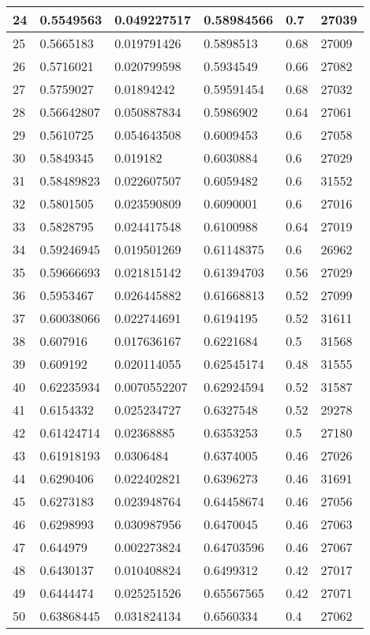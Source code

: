\begin{longtable}{|l|l|l|l|l|l|}
24 & 0.5549563 & 0.049227517 & 0.58984566 & 0.7 & 27039 \\ \hline 
25 & 0.5665183 & 0.019791426 & 0.5898513 & 0.68 & 27009 \\ \hline 
26 & 0.5716021 & 0.020799598 & 0.5934549 & 0.66 & 27082 \\ \hline 
27 & 0.5759027 & 0.01894242 & 0.59591454 & 0.68 & 27032 \\ \hline 
28 & 0.56642807 & 0.050887834 & 0.5986902 & 0.64 & 27061 \\ \hline 
29 & 0.5610725 & 0.054643508 & 0.6009453 & 0.6 & 27058 \\ \hline 
30 & 0.5849345 & 0.019182 & 0.6030884 & 0.6 & 27029 \\ \hline 
31 & 0.58489823 & 0.022607507 & 0.6059482 & 0.6 & 31552 \\ \hline 
32 & 0.5801505 & 0.023590809 & 0.6090001 & 0.6 & 27016 \\ \hline 
33 & 0.5828795 & 0.024417548 & 0.6100988 & 0.64 & 27019 \\ \hline 
34 & 0.59246945 & 0.019501269 & 0.61148375 & 0.6 & 26962 \\ \hline 
35 & 0.59666693 & 0.021815142 & 0.61394703 & 0.56 & 27029 \\ \hline 
36 & 0.5953467 & 0.026445882 & 0.61668813 & 0.52 & 27099 \\ \hline 
37 & 0.60038066 & 0.022744691 & 0.6194195 & 0.52 & 31611 \\ \hline 
38 & 0.607916 & 0.017636167 & 0.6221684 & 0.5 & 31568 \\ \hline 
39 & 0.609192 & 0.020114055 & 0.62545174 & 0.48 & 31555 \\ \hline 
40 & 0.62235934 & 0.0070552207 & 0.62924594 & 0.52 & 31587 \\ \hline 
41 & 0.6154332 & 0.025234727 & 0.6327548 & 0.52 & 29278 \\ \hline 
42 & 0.61424714 & 0.02368885 & 0.6353253 & 0.5 & 27180 \\ \hline 
43 & 0.61918193 & 0.0306484 & 0.6374005 & 0.46 & 27026 \\ \hline 
44 & 0.6290406 & 0.022402821 & 0.6396273 & 0.46 & 31691 \\ \hline 
45 & 0.6273183 & 0.023948764 & 0.64458674 & 0.46 & 27056 \\ \hline 
46 & 0.6298993 & 0.030987956 & 0.6470045 & 0.46 & 27063 \\ \hline 
47 & 0.644979 & 0.002273824 & 0.64703596 & 0.46 & 27067 \\ \hline 
48 & 0.6430137 & 0.010408824 & 0.6499312 & 0.42 & 27017 \\ \hline 
49 & 0.6444474 & 0.025251526 & 0.65567565 & 0.42 & 27071 \\ \hline 
50 & 0.63868445 & 0.031824134 & 0.6560334 & 0.4 & 27062 \\ \hline 
\end{longtable}